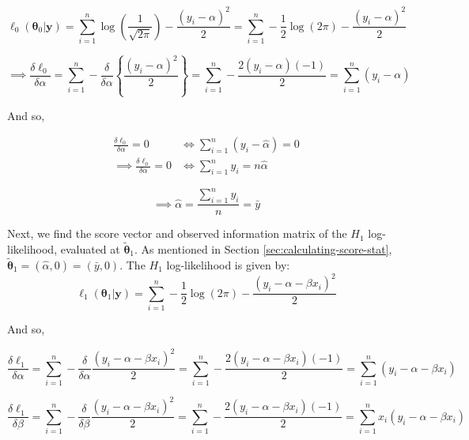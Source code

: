 \documentclass{article}
\newcommand{\thetaZero}{\boldsymbol{\theta}_0}
\newcommand{\thetaOne}{\boldsymbol{\theta}_1}
\newcommand{\thetaOneTilde}{\tilde{\boldsymbol{\theta}}_1}
\newcommand{\lr}[1]{\left( #1 \right)}
\newcommand{\lrbr}[1]{\left\{ #1 \right\}}
\newcommand{\sumN}{\sum_{i=1}^n}
\newcommand{\ellZero}{\ell_0}
\newcommand{\ellOne}{\ell_1}
\newcommand{\betaZero}{\alpha} %
\newcommand{\betaZeroMLE}{\hat{\alpha}}
\newcommand{\betaOne}{\beta} %
\newcommand{\yBold}{\boldsymbol{y}}
\newcommand{\yBar}{\bar{y}}
\begin{document}
\begin{equation*}
  \ellZero \left(\thetaZero | \yBold \right) = \sumN \log
  \lr{\frac{1}{\sqrt{2 \pi}}} - \frac{(y_i - \betaZero)^2}{2} = \sumN
  - \frac{1}{2} \log(2 \pi) - \frac{(y_i - \betaZero)^2}{2}
\end{equation*}

\begin{equation*}
  \implies \frac{\delta \ellZero}{\delta \alpha} = \sumN -
  \frac{\delta}{\delta \betaZero} \lrbr{\frac{(y_i - \betaZero)^2}{2}}
  = \sumN - \frac{2 (y_i - \betaZero) (-1)}{2} = \sumN (y_i - \betaZero)
\end{equation*}

And so,

\begin{equation*}
  \begin{split}
  \frac{\delta \ellZero}{\delta \betaZero} = 0 & \iff \sumN
  (y_i - \betaZeroMLE) = 0 \\
  \implies \frac{\delta \ellZero}{\delta \betaZero} = 0 & \iff \sumN y_i = n \betaZeroMLE
  \end{split}
\end{equation*}

\begin{equation*}
  \implies \betaZeroMLE = \frac{\sumN y_i}{n} = \yBar
\end{equation*}

Next, we find the score vector and observed information matrix of the
$H_1$ log-likelihood, evaluated 
at $\thetaOneTilde$. As mentioned in Section
\ref{sec:calculating-score-stat}, $\thetaOneTilde = \left(
  \hat{\alpha}, 0 \right) = (\yBar, 0)$. The $H_1$ log-likelihood is given by:
\begin{equation*}
  \ellOne \left( \thetaOne | \yBold \right) = \sumN - \frac{1}{2} \log(2
  \pi) - \frac{(y_i - \betaZero - \betaOne x_i)^2}{2}
\end{equation*}

And so,

\begin{equation*}
  \frac{\delta \ellOne}{\delta \betaZero} = \sumN -
  \frac{\delta}{\delta \betaZero} \frac{(y_i - \betaZero - \betaOne
    x_i)^2}{2} = \sumN - \frac{2 (y_i - \betaZero - \betaOne x_i)
    (-1)}{2} = \sumN (y_i - \betaZero - \betaOne x_i)
\end{equation*}

\begin{equation*}
  \frac{\delta \ellOne}{\delta \betaOne} = \sumN -\frac{\delta}{\delta
  \betaOne} \frac{(y_i - \betaZero - \betaOne x_i)^2}{2} = \sumN -
\frac{2 (y_i - \betaZero - \betaOne x_i) (-1)}{2} = \sumN x_i (y_i -
\betaZero - \betaOne x_i) 
\end{equation*}
\end{document}
